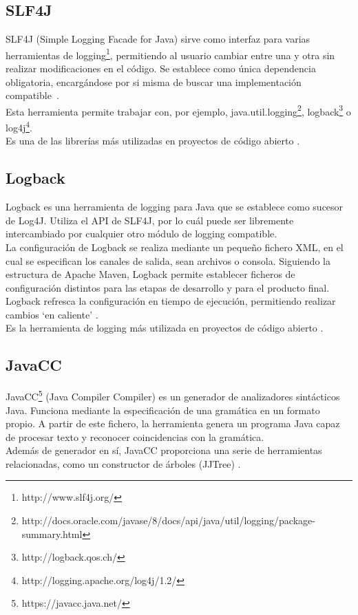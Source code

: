 \subsection{SLF4J}
SLF4J (Simple Logging Facade for Java) sirve como interfaz para varias herramientas de logging\footnote{http://www.slf4j.org/}, permitiendo al usuario cambiar entre una y otra sin realizar modificaciones en el código.
Se establece como única dependencia obligatoria, encargándose por si misma de buscar una implementación compatible~\cite{website:slf4j}.
\\
Esta herramienta permite trabajar con, por ejemplo, java.util.logging\footnote{http://docs.oracle.com/javase/8/docs/api/java/util/logging/package-summary.html}, logback\footnote{http://logback.qos.ch/} o log4j\footnote{http://logging.apache.org/log4j/1.2/}.
\\
Es una de las librerías más utilizadas en proyectos de código abierto \cite{website:githubTOP}.

\subsection{Logback}
Logback es una herramienta de logging para Java que se establece como sucesor de Log4J.
Utiliza el API de SLF4J, por lo cuál puede ser libremente intercambiado por cualquier otro módulo de logging compatible.
\\
La configuración de Logback se realiza mediante un pequeño fichero XML, en el cual se especifican los canales de salida, sean archivos o consola.
Siguiendo la estructura de Apache Maven, Logback permite establecer ficheros de configuración distintos para las etapas de desarrollo y para el producto final.
Logback refresca la configuración en tiempo de ejecución, permitiendo realizar cambios `en caliente' \cite{website:logback}.
\\
Es la herramienta de logging más utilizada en proyectos de código abierto \cite{website:githubTOP}.

\subsection{JavaCC}
JavaCC\footnote{https://javacc.java.net/} (Java Compiler Compiler) es un generador de analizadores sintácticos Java.
Funciona mediante la especificación de una gramática en un formato propio.
A partir de este fichero, la herramienta genera un programa Java capaz de procesar texto y reconocer coincidencias con la gramática.
\\
Además de generador en sí, JavaCC proporciona una serie de herramientas relacionadas, como un constructor de árboles (JJTree) \cite{website:javacc}.


